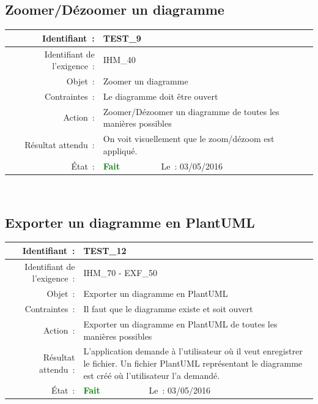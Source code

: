 \documentclass[hidelinks, a4paper,11pt,twoside,final]{article}
\begin{document}
    
    \subsection*{Zoomer/Dézoomer un diagramme}
    \begin{tabular}{|r|p{5cm}|p{5cm}|}\hline
    {Identifiant~:} & \multicolumn{2}{|p{10cm}|}{TEST\_9} \\\hline
    {Identifiant de l’exigence~:} & \multicolumn{2}{|p{10cm}|}{IHM\_40} \\\hline
        {Objet~:} & \multicolumn{2}{|p{10cm}|}{Zoomer un diagramme} \\\hline
        {Contraintes~:} & \multicolumn{2}{|p{10cm}|}{Le diagramme doit être ouvert} \\\hline
        {Action~:} & \multicolumn{2}{|p{10cm}|}{Zoomer/Dézoomer un diagramme de toutes les manières possibles} \\\hline
        {Résultat attendu~:} & \multicolumn{2}{|p{10cm}|}{On voit visuellement que le zoom/dézoom est appliqué.} \\\hline
        {État~:} & {\textcolor{green}{\textbf{Fait}}} & {Le~: 03/05/2016 } \\\hline
    \end{tabular}
    \\
    \newline
    
     \subsection*{Exporter un diagramme en PlantUML}
    \begin{tabular}{|r|p{5cm}|p{5cm}|}\hline
    {Identifiant~:} & \multicolumn{2}{|p{10cm}|}{TEST\_12} \\\hline
    {Identifiant de l’exigence~:} & \multicolumn{2}{|p{10cm}|}{IHM\_70 - EXF\_50} \\\hline
        {Objet~:} & \multicolumn{2}{|p{10cm}|}{Exporter un diagramme en PlantUML} \\\hline
        {Contraintes~:} & \multicolumn{2}{|p{10cm}|}{Il faut que le diagramme existe et soit ouvert} \\\hline
        {Action~:} & \multicolumn{2}{|p{10cm}|}{Exporter un diagramme en PlantUML de toutes les manières possibles} \\\hline
        {Résultat attendu~:} & \multicolumn{2}{|p{10cm}|}{L’application demande à l’utilisateur où il veut enregistrer le fichier.
                             Un fichier PlantUML représentant le diagramme est créé où l’utilisateur l’a demandé.} \\\hline
        {État~:} & {\textcolor{green}{\textbf{Fait}}} & {Le~: 03/05/2016 } \\\hline
    \end{tabular}
    \\
    \newline
\end{document}

